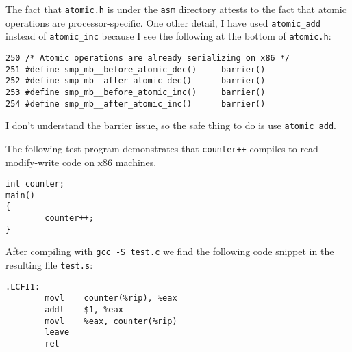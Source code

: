 \documentclass{article}
\begin{document}
\noindent
The fact that \verb$atomic.h$ is under the \verb$asm$ directory attests to the fact
that atomic operations are processor-specific.
One other detail, I have used \verb$atomic_add$ instead of \verb$atomic_inc$
because I see the following at the bottom of \verb$atomic.h$:

\begin{verbatim}
250 /* Atomic operations are already serializing on x86 */
251 #define smp_mb__before_atomic_dec()     barrier()
252 #define smp_mb__after_atomic_dec()      barrier()
253 #define smp_mb__before_atomic_inc()     barrier()
254 #define smp_mb__after_atomic_inc()      barrier()
\end{verbatim}
I don't understand the barrier issue, so the safe thing to do is use \verb$atomic_add$.

\newpage

\noindent
The following test program demonstrates that \verb$counter++$ compiles to
read-modify-write code on x86 machines.

\begin{verbatim}
int counter;
main()
{
        counter++;
}
\end{verbatim}
After compiling with \verb$gcc -S test.c$ we find the following code snippet in
the resulting file \verb$test.s$:

\begin{verbatim}
.LCFI1:
        movl    counter(%rip), %eax
        addl    $1, %eax
        movl    %eax, counter(%rip)
        leave
        ret
\end{verbatim}
\end{document}
